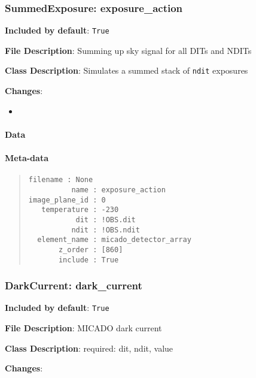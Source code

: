 \subsubsection{SummedExposure: \textquotedbl{}exposure\_action\textquotedbl{}%
  \label{summedexposure-exposure-action}%
}

\textbf{Included by default}: \texttt{True}

\textbf{File Description}: Summing up sky signal for all DITs and NDITs

\textbf{Class Description}: Simulates a summed stack of \texttt{ndit} exposures

\textbf{Changes}:

\begin{itemize}
\item \end{itemize}


\paragraph{Data%
  \label{id5}%
}


\paragraph{Meta-data%
  \label{id6}%
}

\begin{quote}
\begin{alltt}
\begin{lstlisting}[frame=single]
      filename : None
          name : exposure_action
image_plane_id : 0
   temperature : -230
           dit : !OBS.dit
          ndit : !OBS.ndit
  element_name : micado_detector_array
       z_order : [860]
       include : True
\end{lstlisting}
\end{alltt}
\end{quote}


\subsubsection{DarkCurrent: \textquotedbl{}dark\_current\textquotedbl{}%
  \label{darkcurrent-dark-current}%
}

\textbf{Included by default}: \texttt{True}

\textbf{File Description}: MICADO dark current

\textbf{Class Description}: required: dit, ndit, value

\textbf{Changes}:

